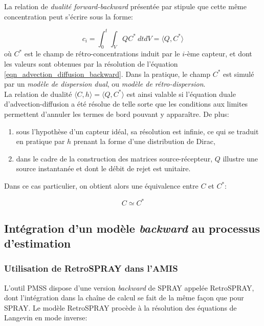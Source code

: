 La relation de \textit{dualité forward-backward} présentée par \cite{Keats2007} stipule que cette même concentration peut s'écrire sous la forme:

\begin{equation}
c_i = \int_0^t \int_V Q C^* ~ dtdV = \langle Q, C^*\rangle
\label{eq_int_adjoint}
\end{equation}
où $C^*$ est le champ de rétro-concentrations induit par le $i$-ème capteur, et dont les valeurs sont obtenues par la résolution de l'équation \eqref{eqn_advection_diffusion_backward}. Dans la pratique, le champ $C^*$ est simulé par un \textit{modèle de dispersion dual}, ou \textit{modèle de rétro-dispersion}.\\

La relation de dualité $\langle C,h\rangle = \langle Q,C^* \rangle$ est ainsi valable si l'équation duale d'advection-diffusion a été résolue de telle sorte que les conditions aux limites permettent d'annuler les termes de bord pouvant y apparaître. De plus:

\begin{enumerate}
	\item sous l'hypothèse d'un capteur idéal, sa résolution est infinie, ce qui se traduit en pratique par $h$ prenant la forme d'une distribution de Dirac,
	\item dans le cadre de la construction des matrices source-récepteur, $Q$ illustre une source instantanée et dont le débit de rejet est unitaire.
\end{enumerate}

Dans ce cas particulier, on obtient alors une équivalence entre $C$ et $C^*$: 

\begin{equation}
C \simeq C^*
\label{eq_equivalence}
\end{equation}


\subsection{Intégration d'un modèle \textit{backward} au processus d'estimation}

\subsubsection{Utilisation de RetroSPRAY dans l'AMIS}

L'outil PMSS dispose d'une version \textit{backward} de SPRAY appelée RetroSPRAY, dont l'intégration dans la chaîne de calcul se fait de la même façon que pour SPRAY. Le modèle RetroSPRAY procède à la résolution des équations de Langevin en mode inverse: 

